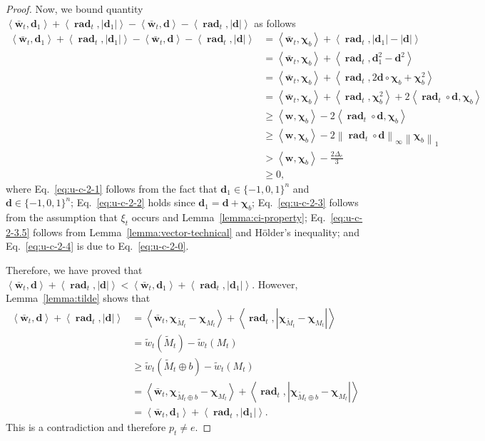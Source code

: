 \documentclass{article}
\DeclareMathOperator{\rad}{rad}
\newcommand{\inn}[1]{\left\langle #1 \right\rangle}
\newcommand{\nor}[1]{\left\|#1\right\|}
\renewcommand{\vec}[1]{\boldsymbol{#1}}
\renewcommand{\odot}{\circ}
\begin{document}
\begin{proof}
Now, we bound quantity $\inn{\vec {\bar w}_t, \vec d_1}+\inn{\vec \rad_t, |\vec d_1|}
-\inn{\vec {\bar w}_t, \vec d}-\inn{\vec \rad_t,  |\vec d|}$ as follows
\begin{align}
\inn{\vec {\bar w}_t, \vec d_1}+\inn{\vec \rad_t, |\vec d_1|}
-\inn{\vec {\bar w}_t, \vec d}-\inn{\vec \rad_t,  |\vec d|}
& = \inn{\vec {\bar w}_t, \vec \chi_b} + \inn{\vec \rad_t, |\vec d_1|-|\vec d|} \nonumber\\
& =	\inn{\vec {\bar w}_t, \vec \chi_b} + \inn{\vec \rad_t, \vec d_1^2-\vec d^2} \label{eq:u-c-2-1} \\
& =	\inn{\vec {\bar w}_t, \vec \chi_b} + \inn{\vec \rad_t, 2\vec d\odot \vec \chi_b +\vec \chi_b^2} \label{eq:u-c-2-2} \\
& =	\inn{\vec {\bar w}_t, \vec \chi_b} + \inn{\vec \rad_t, \vec\chi_b^2} + 2\inn{\vec \rad_t\odot \vec d, \vec \chi_b} \nonumber \\
& \ge \inn{\vec w, \vec \chi_b}- 2\inn{\vec \rad_t\odot \vec d, \vec \chi_b}  \label{eq:u-c-2-3} \\
& \ge \inn{\vec w, \vec \chi_b}-2\nor{\vec \rad_t\odot \vec d}_\infty\nor{\vec\chi_b}_1 \label{eq:u-c-2-3.5} \\
& > \inn{\vec w, \vec \chi_b}-\frac{2\Delta_e}{3} \label{eq:u-c-2-4} \\
& \ge 0 \label{eq:u-c-2-5},
\end{align}
where Eq.~\eqref{eq:u-c-2-1} follows from the fact that $\vec d_1\in \{-1,0,1\}^n$ and $\vec d \in \{-1,0,1\}^n$;
Eq.~\eqref{eq:u-c-2-2} holds since $\vec d_1=\vec d+\vec \chi_b$;
Eq.~\eqref{eq:u-c-2-3} follows from the assumption that $\xi_t$ occurs and Lemma~\ref{lemma:ci-property};
Eq.~\eqref{eq:u-c-2-3.5} follows from Lemma~\ref{lemma:vector-technical}  and H\"older's inequality;
and Eq.~\eqref{eq:u-c-2-4} is due to Eq.~\eqref{eq:u-c-2-0}.

Therefore, we have proved that $\inn{\vec {\bar w}_t, \vec d}+\inn{\vec \rad_t,  |\vec d|} < \inn{\vec {\bar w}_t, \vec d_1}+\inn{\vec \rad_t, |\vec d_1|}.
$
However, Lemma~\ref{lemma:tilde} shows that 
\begin{align*}
\inn{\vec {\bar w}_t, \vec d}+\inn{\vec \rad_t,  |\vec d|} 
&= \inn{\vec {\bar w}_t, \vec \chi_{\tilde M_t} - \vec \chi_{M_t}}+\inn{\vec \rad_t,  |\vec \chi_{\tilde M_t} - \vec \chi_{M_t}|} \\
&= \tilde w_t(\tilde M_t) - \tilde w_t(M_t)\\
& \ge \tilde w_t(\tilde M_t \oplus b)-\tilde w_t(M_t)\\
&= \inn{\vec {\bar w}_t, \vec \chi_{\tilde M_t \oplus b} - \vec \chi_{M_t}}+\inn{\vec \rad_t,  |\vec \chi_{\tilde M_t \oplus b} - \vec \chi_{M_t}|} \\
&= \inn{\vec {\bar w}_t, \vec d_1}+\inn{\vec \rad_t,  |\vec d_1|}. 
\end{align*}
This is a contradiction and therefore $p_t\not= e$.

\end{proof}
\end{document}
